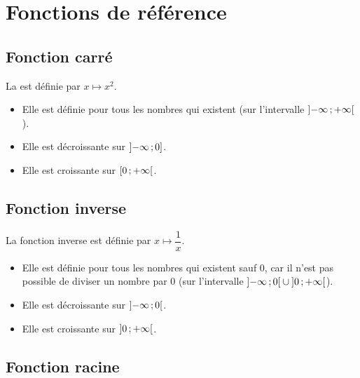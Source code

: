 \documentclass[12pt,a4paper]{article}
\begin{document}
\section{Fonctions de référence}

\subsection{Fonction carré}

\begin{mydef}
	La  est définie par $x \mapsto x^2$.
\end{mydef}
\begin{myprops}
	\begin{itemize}
		\item Elle est définie pour tous les nombres qui existent (sur l'intervalle $\mbox{\ensuremath{\left]- \infty \mathpunct{};+ \infty\right[}}$).
		\item Elle est décroissante sur $\mbox{\ensuremath{\left]- \infty\mathpunct{};0\right]}}$.
		\item Elle est croissante sur $\mbox{\ensuremath{\left[0\mathpunct{};+ \infty\right[}}$.
	\end{itemize}
	
\end{myprops}



\subsection{Fonction inverse}

\begin{mydef}
	La fonction inverse est définie par $x \mapsto \dfrac{1}{x}$.			
\end{mydef}

\begin{myprops}
	\begin{itemize}
		\item Elle est définie pour tous les nombres qui existent sauf 0, car il n'est pas possible de diviser un nombre par 0 (sur l'intervalle $\mbox{\ensuremath{\left]-\infty\mathpunct{};0\right[}} \cup \mbox{\ensuremath{\left]0\mathpunct{};+\infty\right[}}$).
		\item Elle est décroissante sur $\mbox{\ensuremath{\left]- \infty\mathpunct{};0\right[}}$.
		\item Elle est croissante sur $\mbox{\ensuremath{\left]0\mathpunct{};+ \infty\right[}}$. 
	\end{itemize}
\end{myprops}


\subsection{Fonction racine}
\end{document}
